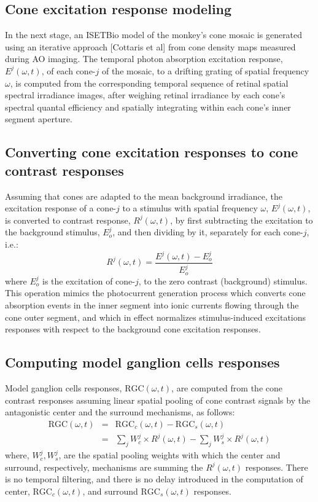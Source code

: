 \documentclass[11pt, oneside]{article}   	%
\begin{document}
\subsection{Cone excitation response modeling}
In the next stage, an ISETBio model of the monkey's cone mosaic is generated using an iterative approach [Cottaris et al] from cone density maps measured during AO imaging. The temporal photon absorption excitation response, $E^j(\omega,t)$, of each cone-$j$ of the mosaic, to a drifting grating of spatial frequency $\omega$, is computed from the corresponding temporal sequence of retinal spatial spectral irradiance images, after weighing retinal irradiance by each cone's spectral quantal efficiency and spatially integrating within each cone's inner segment aperture. 

\subsection{Converting cone excitation responses to cone contrast responses}
Assuming that cones are adapted to the mean background irradiance, the excitation response of a cone-$j$ to a stimulus with spatial frequency $\omega$, $E^j(\omega,t)$, is converted to contrast response, $R^j(\omega, t)$, by first subtracting the excitation to the background stimulus, $E^j_o$, and then dividing by it, separately for each cone-$j$, i.e.:
\begin{equation}
R^j(\omega, t) = \frac{E^j(\omega,t) - E^j_o}{E^j_o}
\end{equation}
\noindent where
$E^j_o$ is the excitation of cone-$j$, to the zero contrast (background) stimulus. This operation mimics the photocurrent generation process which converts cone absorption events in the inner segment into ionic currents flowing through the cone outer segment, and which in effect normalizes stimulus-induced excitations responses with respect to the background cone excitation responses.



\subsection{Computing model ganglion cells responses}
Model ganglion cells responses, $\mbox{RGC}(\omega,t)$, are computed from the cone contrast responses assuming linear spatial pooling of cone contrast signals by the antagonistic center and the surround mechanisms, as follows:
\begin{eqnarray}
\mbox{RGC}(\omega,t) & = & \mbox{RGC}_c(\omega,t) - \mbox{RGC}_s(\omega,t) \\
& = & \sum_{j} W_{c}^j  \times R^j(\omega, t) -  \sum_{j} W_{s}^j  \times R^j(\omega, t)
\end{eqnarray}
%
\noindent where, $W_{c}^j, W_{s}^j$, are the spatial pooling weights with which the center and surround, respectively, mechanisms are summing the $R^j(\omega, t)$ responses. There is no temporal filtering, and there is no delay introduced in the computation of center, $\mbox{RGC}_c(\omega,t)$, and surround $\mbox{RGC}_s(\omega,t)$ responses. 
\end{document}
